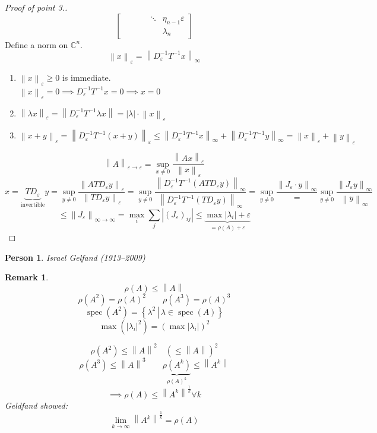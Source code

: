 \documentclass[a4paper]{article}
\newcounter{lecref}[section]
\numberwithin{lecref}{section}
\newtheorem{remark}[lecref]{Remark}
\newtheorem*{Person}{Person}
\newcommand{\setdef}[2]{\left\{\left.#1\,\right|\,#2\right\}}
\newcommand{\norm}[1]{\left\|#1\right\|}
\newcommand{\card}[1]{\left|#1\right|}
\begin{document}
\begin{proof}[Proof of point 3.]
\[\begin{bmatrix}
          & & & & \ddots & \eta_{n-1} \varepsilon \\
          & & & & & \lambda_n
      \end{bmatrix}
  \]
  Define a norm on $\mathbb C^n$.
  \[ \norm{x}_{\varepsilon} = \norm{D_{\varepsilon}^{-1} T^{-1} x}_{\infty} \]
  \begin{enumerate}
    \item $\norm{x}_{\varepsilon} \geq 0$ is immediate. \\
      $\norm{x}_{\varepsilon} = 0 \implies D_{\varepsilon}^{-1} T^{-1} x = 0 \implies x = 0$
    \item $\norm{\lambda x}_{\varepsilon} = \norm{D_{\varepsilon}^{-1} T^{-1} \lambda x} = \card{\lambda} \cdot \norm{x}_{\varepsilon}$
    \item $\norm{x + y}_{\varepsilon} = \norm{D_{\varepsilon}^{-1} T^{-1} (x + y)}_{\varepsilon} \leq \norm{D_{\varepsilon}^{-1} T^{-1} x}_{\infty} + \norm{D^{-1}_{\varepsilon} T^{-1} y}_{\infty} = \norm{x}_{\varepsilon} + \norm{y}_{\varepsilon}$
  \end{enumerate}
  \[ \norm{A}_{\varepsilon\to\varepsilon} = \sup_{x \neq 0} \frac{\norm{Ax}_{\varepsilon}}{\norm{x}_{\varepsilon}} \]
  \[ x = \underbrace{TD_{\varepsilon}}_{\text{invertible}} y = \sup_{y \neq 0} \frac{\norm{AT D_{\varepsilon} y}_{\varepsilon}}{\norm{TD_{\varepsilon} y}_{\varepsilon}} = \sup_{y \neq 0} \frac{\norm{D_{\varepsilon}^{-1} T^{-1} \left(ATD_{\varepsilon} y\right)}_{\infty}}{\norm{D_{\varepsilon}^{-1} T^{-1} \left(TD_{\varepsilon} y\right)}_{\infty}} = \sup_{y \neq 0} \frac{\norm{J_{\varepsilon} \cdot y}_{\infty}} = \sup_{y \neq 0} \frac{\norm{J_{\varepsilon} y}_{\infty}}{\norm{y}_{\infty}} \]
  \[ \leq \norm{J_{\varepsilon}}_{\infty \to \infty} = \max_i \sum_j \card{(J_{\varepsilon})_{ij}} \leq \underbrace{\max \card{\lambda_i} + \varepsilon}_{= \rho(A) + \varepsilon} \]
\end{proof}

\begin{Person}
  Israel Gelfand (1913--2009)
\end{Person}

\begin{remark} %
  \[ \rho(A) \leq \norm{A} \]
  \[ \rho(A^2) = \rho(A)^2 \qquad \rho(A^3) = \rho(A)^3 \]
  \[ \operatorname{spec}(A^2) = \setdef{\lambda^2}{\lambda \in \operatorname{spec}(A)} \]
  \[ \max(\card{\lambda_i}^2) = \left(\max\card{\lambda_i}\right)^2 \]

  \[ \rho(A^2) \leq \norm{A}^2 \quad (\leq \norm{A})^2 \]
  \[ \rho(A^3) \leq \norm{A}^3 \qquad \underbrace{\rho(A^k)}_{\rho(A)^k} \leq \norm{A^k} \]
  \[ \implies \rho(A) \leq \norm{A^k}^{\frac1k} \forall k \]
  Geldfand showed:
  \[ \lim_{k\to\infty} \norm{A^k}^{\frac1k} = \rho(A) \]
\end{remark}
\end{document}
